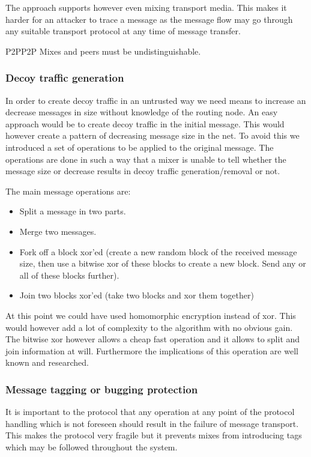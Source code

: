 The approach supports however even mixing transport media. This makes it harder for an attacker to trace a message as the message flow may go through any suitable transport protocol at any time of message transfer.

\begin{requirement}{P2P}{P2P}
	Mixes and peers must be undistinguishable.
\end{requirement}

\subsubsection{Decoy traffic generation}
In order to create decoy traffic in an untrusted way we need means to increase an decrease messages in size without knowledge of the routing node. An easy approach would be to create decoy traffic in the initial message. This would however create a pattern of decreasing message size in the net. To avoid this we introduced a set of operations to be applied to the original message. The operations are done in such a way that a mixer is unable to tell whether the message size or decrease results in decoy traffic generation/removal or not.

The main message operations are:
\begin{itemize}
	\item Split a message in two parts.
	\item Merge two messages.
	\item Fork off a block xor'ed (create a new random block of the received message size, then use a bitwise xor of these blocks to create a new block. Send any or all of these blocks further).
	\item Join two blocks xor'ed (take two blocks and xor them together)
\end{itemize}

At this point we could have used homomorphic encryption instead of xor. This would however add a lot of complexity to the algorithm with no obvious gain. The bitwise xor however allows a cheap fast operation and it allows to split and join information at will. Furthermore the implications of this operation are well known and researched.

\subsubsection{Message tagging or bugging protection}
It is important to the protocol that any operation at any point of the protocol handling which is not foreseen should result in the failure of message transport. This makes the protocol very fragile but it prevents mixes from introducing tags which may be followed throughout the system.

